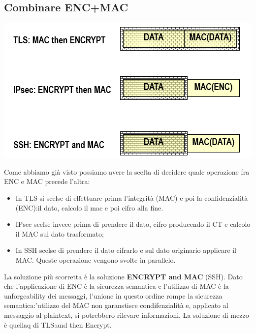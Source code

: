 \documentclass{book}
\theoremstyle{remark}
\begin{document}
\subsection{Combinare ENC+MAC}
\begin{center}
	\includegraphics[scale=0.5]{ENCMAC.png}
\end{center}
Come abbiamo già visto possiamo avere la scelta di decidere quale operazione fra ENC e MAC precede l'altra:\begin{itemize}
	\item In TLS si scelse di effettuare prima l'integrità (MAC) e poi la confidenzialità (ENC):\@prendo il dato, calcolo il mac e poi cifro alla fine\@.
	\item IPsec scelse invece prima di prendere il dato, cifro producendo il CT e calcolo il MAC sul dato trasformato;\@
	\item In SSH scelse di prendere il dato cifrarlo e sul dato originario applicare il MAC\@. Queste operazione vengono svolte in parallelo\@.
\end{itemize}
La soluzione più scorretta è la soluzione \textbf{ENCRYPT and MAC} (SSH)\@. Dato che l'applicazione di ENC è la sicurezza semantica e l'utilizzo di MAC è la unforgeability dei messaggi, l'unione in questo ordine rompe la sicurezza semantica:\@l'utilizzo del MAC non garanstisce condifenzialità e, applicato al messaggio al plaintext, si potrebbero rilevare informazioni\@.
La soluzione di mezzo è quellaq di TLS:\@Mac and then Encrypt\@.
\end{document}
